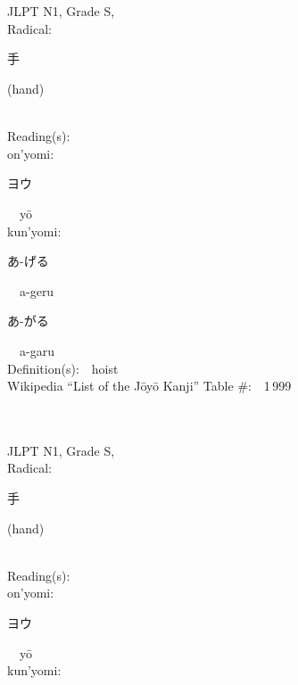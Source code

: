 \begin{multicols}{2}
\ \ \\
{\fontsize{34pt}{40pt}  }\ \ \\
{JLPT N1, Grade S, \\Radical:\ \ {\begin{CJK}{UTF8}{min} 手 \end{CJK}} (hand) } \\
Reading(s):\ \ \\
{\hspace*{1em}}on'yomi:\ \ \\
{\hspace*{2em}}{\begin{CJK}{UTF8}{min} ヨウ \end{CJK}}\ \ y\=o\ \ \\
{\hspace*{1em}}kun'yomi:\ \ \\
{\hspace*{2em}}{\begin{CJK}{UTF8}{min} あ-げる \end{CJK}}\ \ a-geru\ \ \\
{\hspace*{2em}}{\begin{CJK}{UTF8}{min} あ-がる \end{CJK}}\ \ a-garu\ \ \\
Definition(s):\ \ hoist \\
Wikipedia ``List of the J\=oy\=o Kanji'' Table \#:\ \ 1\,999 \\
\ \ \\
{\fontsize{34pt}{40pt}  }\ \ \\
{JLPT N1, Grade S, \\Radical:\ \ {\begin{CJK}{UTF8}{min} 手 \end{CJK}} (hand) } \\
Reading(s):\ \ \\
{\hspace*{1em}}on'yomi:\ \ \\
{\hspace*{2em}}{\begin{CJK}{UTF8}{min} ヨウ \end{CJK}}\ \ y\=o\ \ \\
{\hspace*{1em}}kun'yomi:\ \ \\

\end{multicols}
